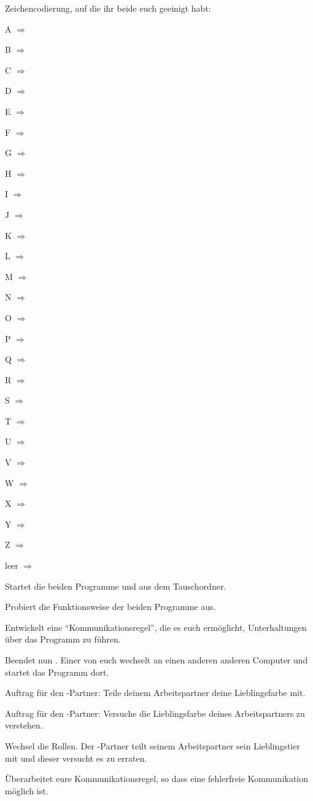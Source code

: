 \documentclass[10pt, a4paper]{arbeitsblatt}
\newcommand{\letter}[2][1.5cm]{#2 $\Rightarrow$ \luecke{#1}}
\begin{document}
Zeichencodierung, auf die ihr beide euch geeinigt habt:
\begin{rahmen}
\begin{multicols}{5}
	\letter{A}

	\letter{B}

	\letter{C}

	\letter{D}

	\letter{E}

	\letter{F}

	\letter{G}

	\letter{H}

	\letter{I}

	\letter{J}

	\letter{K}

	\letter{L}

	\letter{M}

	\letter{N}

	\letter{O}

	\letter{P}

	\letter{Q}

	\letter{R}

	\letter{S}

	\letter{T}

	\letter{U}

	\letter{V}

	\letter{W}

	\letter{X}

	\letter{Y}

	\letter{Z}

	\letter[1.1cm]{leer}
\end{multicols}
\end{rahmen}

\begin{aufgabe}
	Startet die beiden Programme  und  aus dem Tauschordner.

	\begin{teilaufgaben}
		\teilaufgabe Probiert die Funktionsweise der beiden Programme aus.

		\teilaufgabe Entwickelt eine \enquote{Kommunikationsregel}, die es euch ermöglicht, Unterhaltungen über das Programm zu führen.
	\end{teilaufgaben}
\end{aufgabe}

\begin{aufgabe}
	Beendet nun . Einer von euch wechselt an einen anderen anderen Computer und startet das Programm dort.

	\begin{teilaufgaben}
		\teilaufgabe Auftrag für den -Partner: Teile deinem Arbeitspartner deine Lieblingsfarbe mit.

		Auftrag für den -Partner: Versuche die Lieblingsfarbe deines Arbeitspartners zu verstehen.

		\teilaufgabe Wechsel die Rollen. Der -Partner teilt seinem Arbeitspartner sein Lieblingstier mit und dieser versucht es zu erraten.
	\end{teilaufgaben}
\end{aufgabe}

\begin{aufgabe}
	Überarbeitet eure Kommunikationsregel, so dass eine fehlerfreie Kommunikation möglich ist.
\end{aufgabe}
\end{document}
